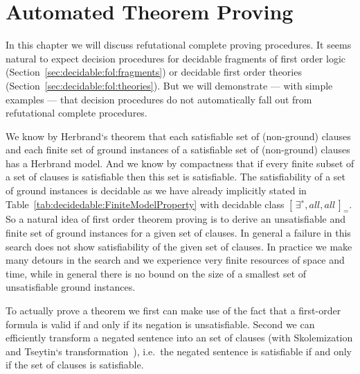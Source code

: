 
\chapter{Automated Theorem Proving}\label{chapter:automation}



In this chapter we will discuss refutational complete proving procedures.
It seems natural to expect decision procedures
for decidable fragments of first order logic
(Section~\ref{sec:decidable:fol:fragments})
or decidable first order theories (Section~\ref{sec:decidable:fol:theories}).
But we will demonstrate --- with simple examples ---
that decision procedures do not automatically
fall out from refutational complete procedures.


%
We know by Herbrand`s theorem
that each satisfiable set of (non-ground) clauses
and each finite set of ground instances of a satisfiable set of (non-ground) clauses
has a Herbrand model.
And we know by compactness
that if every finite subset of a set of clauses is satisfiable then this set is satisfiable.
The satisfiability of a set of ground instances is decidable
as we have already implicitly stated in Table~\vref{tab:decidedable:FiniteModelProperty}
with decidable class \( {[ \, \exists^{∗}, all, all \, ]}_{=} \).
So a natural idea of first order theorem proving
is to derive an unsatisfiable and finite set of ground instances for a given set of clauses.
In general a failure in this search does not show satisfiability of the given set of clauses.
In practice we make many detours in the search and we experience very finite resources of space and time,
while in general there is no bound on the size of a smallest set of unsatisfiable ground instances.



To actually prove a theorem
we first can make use of the fact that a first-order formula is valid if and only if its negation is unsatisfiable.
Second we can efficiently transform a negated sentence into an
 set of clauses
(with Skolemization and Tseytin`s transformation~\cite{tseitin70}),
i.e.~the negated sentence is satisfiable if and only if the set of clauses is satisfiable.

